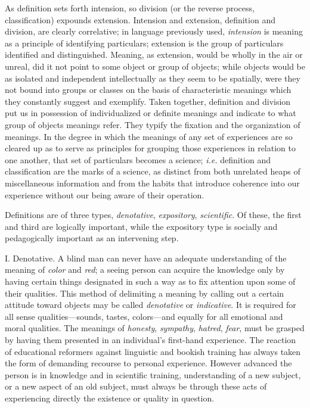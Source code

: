 \documentclass[letterpaper]{book}
\begin{document}

As definition sets forth intension, so division (or the reverse process,
classification) expounds extension. Intension and extension, definition
and division, are clearly correlative; in language previously used,
\emph{intension} is meaning as a principle of identifying particulars;
extension is the group of particulars identified and distinguished.
Meaning, as extension, would be wholly in the air or unreal, did it not
point to some object or group of objects; while objects would be as
isolated and independent intellectually as they seem to be spatially,
were they not bound into groups or classes on the basis of
characteristic meanings which they constantly suggest and exemplify.
Taken together, definition and division put us in possession of
individualized or definite meanings and indicate to what group of
objects meanings refer. They typify the fixation and the organization of
meanings. In the degree in which the meanings of any set of experiences
are so cleared up as to serve as principles for grouping those
experiences in relation to one another, that set of particulars becomes
a science; \emph{i.e.} definition and classification are the marks of a
science, as distinct from both unrelated heaps of miscellaneous
information and from the habits that introduce coherence into our
experience without our being aware of their operation.

Definitions are of three types, \emph{denotative}, \emph{expository},
\emph{scientific}. Of these, the first and third are logically
important, while the expository type is socially and pedagogically
important as an intervening step.


I. Denotative. A blind man can never have an adequate understanding of
the meaning of \emph{color} and \emph{red}; a seeing person can acquire
the knowledge only by
having
certain things designated in such a way as to fix attention upon some of
their qualities. This method of delimiting a meaning by calling out a
certain attitude toward objects may be called \emph{denotative} or
\emph{indicative}. It is required for all sense qualities---sounds,
tastes, colors---and equally for all emotional and moral qualities. The
meanings of \emph{honesty}, \emph{sympathy}, \emph{hatred}, \emph{fear},
must be grasped by having them presented in an individual's first-hand
experience. The reaction of educational reformers against linguistic and
bookish training has always taken the form of demanding recourse to
personal experience. However advanced the person is in knowledge and in
scientific training, understanding of a new subject, or a new aspect of
an old subject, must always be through these acts of experiencing
directly the existence or quality in question.
\end{document}
